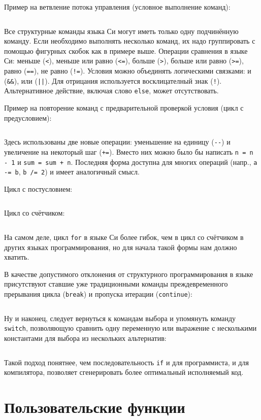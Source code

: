 \zzneedspace
Пример на ветвление потока управления (условное выполнение команд):
%
\inputminted{c}{samples/01_if.c}

Все структурные команды языка Си могут иметь только одну подчинённую команду.
Если необходимо выполнять несколько команд, их надо группировать с помощью
фигурных скобок как в примере выше. Операции сравнения в языке Си: меньше
(\verb|<|), меньше или равно (\verb|<=|), больше (\verb|>|), больше или равно
(\verb|>=|), равно (\verb|==|), не равно (\verb|!=|). Условия можно объединять
логическими связками: и (\verb|&&|), или (\verb/||/). Для отрицания
используется восклицателный знак (\verb|!|). Альтернативное действие,
включая слово \texttt{else}, может отсутствовать.

\zzneedspace
Пример на повторение команд с предварительной проверкой условия (цикл с
предусловием):
%
\inputminted{c}{samples/02_while.c}

Здесь использованы две новые операции: уменьшение на единицу (\verb|--|) и
увеличение на некоторый шаг (\verb|+=|). Вместо них можно было бы написать
\verb|n = n - 1| и \verb|sum = sum + n|. Последняя форма доступна для многих
операций (напр., \verb|a -= b|, \verb|b /= 2|) и имеет аналогичный смысл.

\zzneedspace
Цикл с постусловием:
%
\inputminted{c}{samples/03_do_while.c}

\zzneedspace
Цикл со счётчиком:
%
\inputminted{c}{samples/04_for.c}

На самом деле, цикл \texttt{for} в языке Си более гибок, чем в цикл со
счётчиком в других языках программирования, но для начала такой формы
нам должно хватить.

В качестве допустимого отклонения от структурного программирования в языке
присутствуют ставшие уже традиционными команды преждевременного прерывания
цикла (\texttt{break}) и пропуска итерации (\texttt{continue}):
\zzneedspace
\inputminted{c}{samples/05_break.c}

\zzneedspace
Ну и наконец, следует вернуться к командам выбора и упомянуть команду
\verb|switch|, позволяющую сравнить одну переменную или выражение
с несколькими константами для выбора из нескольких альтернатив:
%
\inputminted{c}{samples/06_switch.c}

Такой подход понятнее, чем последовательность \texttt{if} и для программиста,
и для компилятора, позволяет сгенерировать более оптимальный исполняемый код.


\section{Пользовательские функции}

